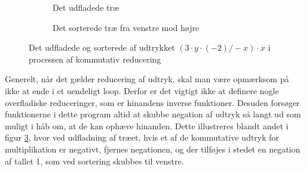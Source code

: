 \begin{figure}[H]
  \centering
  \begin{subfigure}[b]{0.45\textwidth}
    \centering
    \caption{Det udfladede træ}
    \label{fig:sub1}
  \end{subfigure}
  \hfill
  \begin{subfigure}[b]{0.45\textwidth}
    \centering
    \caption{Det sorterede træ fra venstre mod højre}
    \label{fig:sub2}
  \end{subfigure}
  \caption{Det udfladede og sorterede af udtrykket $(3 \cdot y \cdot (-2)/-x) \cdot x$ i processen af kommutativ reducering}
  \label{fig:trees}
\end{figure}

Generelt, når det gælder reducering af udtryk, skal man være opmærksom på ikke at ende i et uendeligt loop. Derfor er det vigtigt ikke at definere nogle overfladiske reduceringer, som er hinandens inverse funktioner. Desuden forsøger funktionerne i dette program altid at skubbe negation af udtryk så langt ud som muligt i håb om, at de kan ophæve hinanden. Dette illustreres blandt andet i figur \ref{fig:trees}, hvor ved udfladning af træet, hvis et af de kommutative udtryk for multiplikation er negativt, fjernes negationen, og der tilføjes i stedet en negation af tallet 1, som ved sortering skubbes til venstre.


